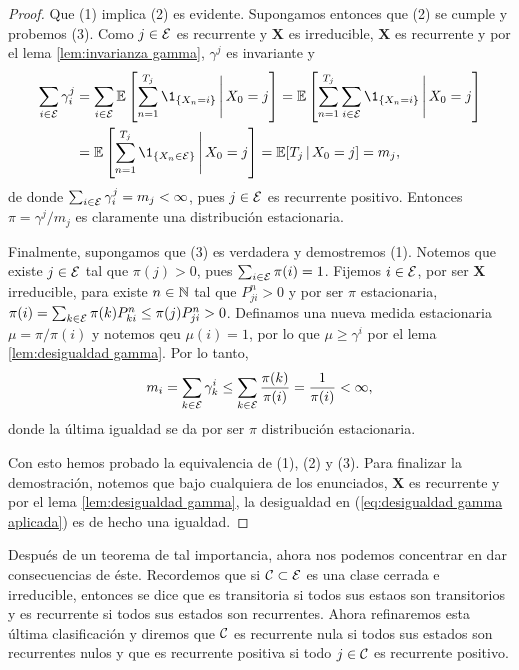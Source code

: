 \begin{proof}
    Que (1) implica (2) es evidente. Supongamos entonces que (2) se cumple y probemos (3). Como $j \in \mathcal{E}$ es recurrente y $\bm X$ es irreducible, $\bm X$ es recurrente y por el lema \ref{lem:invarianza gamma}, $\gamma^j$ es invariante y
    \begin{align*}
        \sum_{i \in \Ee} \gamma_i^j & = \sum_{i \in \Ee} \EE \left[\sum_{n = 1}^{T_j} \1_{\{X_n = i\}} \,\Bigg\vert\, X_0 = j \right] = \EE \left[\sum_{n = 1}^{T_j} \sum_{i \in \Ee} \1_{\{X_n = i\}} \,\Bigg\vert\, X_0 = j \right] \\
        & = \EE \left[\sum_{n = 1}^{T_j} \1_{\{X_n \in \Ee\}} \,\Bigg\vert\, X_0 = j \right] = \EE[T_j \,\vert\, X_0 = j] = m_j,
    \end{align*}
    de donde $\sum_{i \in \mathcal{E}} \gamma_i^j = m_j < \infty$, pues $j \in \mathcal{E}$ es recurrente positivo. Entonces $\pi = \gamma^j / m_j$ es claramente una distribución estacionaria.

    Finalmente, supongamos que (3) es verdadera y demostremos (1). Notemos que existe $j \in \mathcal{E}$ tal que $\pi(j) > 0$, pues $\sum_{i \in \mathcal{E}} \pi(i) = 1$. Fijemos $i \in \mathcal{E}$, por ser $\bm X$ irreducible, para  existe $n \in \mathbb{N}$ tal que $P_{ji}^n > 0$ y por ser $\pi$ estacionaria, $\pi(i) = \sum_{k \in \mathcal{E}} \pi(k) P_{ki}^n \leq \pi(j) P_{ji}^n > 0$. Definamos una nueva medida estacionaria $\mu = \pi / \pi(i)$ y notemos qeu $\mu(i) = 1$, por lo que $\mu \geq \gamma^i$ por el lema \ref{lem:desigualdad gamma}. Por lo tanto,
    \begin{equation}
        m_i = \sum_{k \in \mathcal{E}} \gamma_k^i \leq \sum_{k \in \mathcal{E}} \frac{\pi(k)}{\pi(i)} = \frac{1}{\pi(i)} < \infty, \label{eq:desigualdad gamma aplicada}
    \end{equation}
    donde la última igualdad se da por ser $\pi$ distribución estacionaria.

    Con esto hemos probado la equivalencia de (1), (2) y (3). Para finalizar la demostración, notemos que bajo cualquiera de los enunciados, $\bm X$ es recurrente y por el lema \ref{lem:desigualdad gamma}, la desigualdad en (\ref{eq:desigualdad gamma aplicada}) es de hecho una igualdad.
\end{proof}

Después de un teorema de tal importancia, ahora nos podemos concentrar en dar consecuencias de éste. Recordemos que si $\mathcal{C} \subset \mathcal{E}$ es una clase cerrada e irreducible, entonces se dice que es transitoria si todos sus estaos son transitorios y es recurrente si todos sus estados son recurrentes. Ahora refinaremos esta última clasificación y diremos que $\mathcal{C}$ es recurrente nula si todos sus estados son recurrentes nulos y que es recurrente positiva si todo $j \in \mathcal{C}$ es recurrente positivo. 

